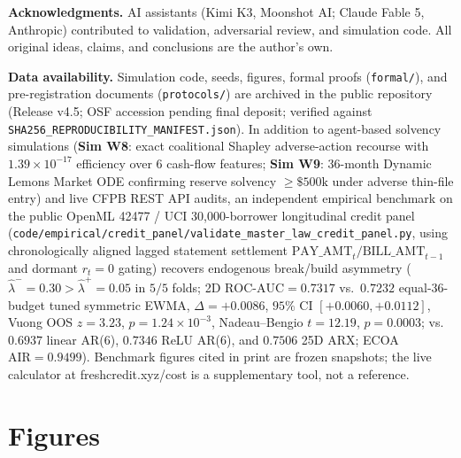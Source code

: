 \documentclass[11pt,twocolumn]{article}
\begin{document}
\textbf{Acknowledgments.} AI assistants (Kimi K3, Moonshot AI; Claude Fable 5, Anthropic) contributed to validation, adversarial review, and simulation code. All original ideas, claims, and conclusions are the author's own.

\textbf{Data availability.} Simulation code, seeds, figures, formal proofs (\texttt{formal/}), and pre-registration documents (\texttt{protocols/}) are archived in the public repository (Release v4.5; OSF accession pending final deposit; verified against \texttt{SHA256\_REPRODUCIBILITY\_MANIFEST.json}). In addition to agent-based solvency simulations (\textbf{Sim W8}: exact coalitional Shapley adverse-action recourse with $1.39 \times 10^{-17}$ efficiency over 6 cash-flow features; \textbf{Sim W9}: 36-month Dynamic Lemons Market ODE confirming reserve solvency $\ge \$500\text{k}$ under adverse thin-file entry) and live CFPB REST API audits, an independent empirical benchmark on the public OpenML 42477 / UCI 30,000-borrower longitudinal credit panel (\texttt{code/empirical/credit\_panel/validate\_master\_law\_credit\_panel.py}, using chronologically aligned lagged statement settlement $\mathrm{PAY\_AMT}_t/\mathrm{BILL\_AMT}_{t-1}$ and dormant $r_t=0$ gating) recovers endogenous break/build asymmetry ($\hat{\lambda}^- = 0.30 > \hat{\lambda}^+ = 0.05$ in $5/5$ folds; 2D $\text{ROC-AUC} = 0.7317$ vs.\ $0.7232$ equal-36-budget tuned symmetric EWMA, $\Delta = +0.0086$, $95\%$ CI $[+0.0060, +0.0112]$, Vuong OOS $z = 3.23$, $p = 1.24 \times 10^{-3}$, Nadeau--Bengio $t = 12.19$, $p = 0.0003$; vs.\ $0.6937$ linear AR(6), $0.7346$ ReLU AR(6), and $0.7506$ 25D ARX; ECOA $\text{AIR} = 0.9499$). Benchmark figures cited in print are frozen snapshots; the live calculator at freshcredit.xyz/cost is a supplementary tool, not a reference.

\section*{Figures}
\end{document}
